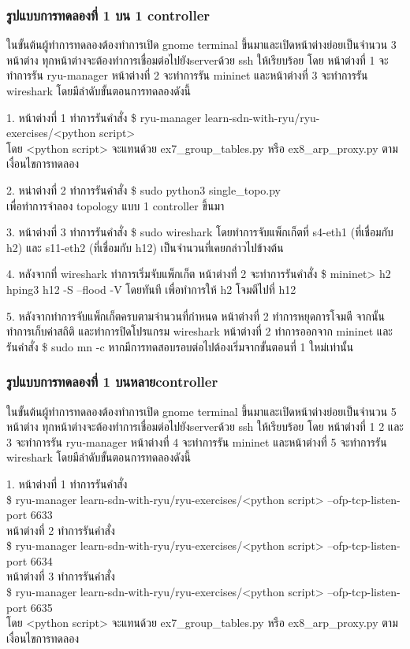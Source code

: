 \subsubsection*{รูปแบบการทดลองที่ 1 บน 1 \gls{controller}}

ในขั้นต้นผู้ทำการทดลองต้องทำการเปิด gnome terminal ขึ้นมาและเปิดหน้าต่างย่อยเป็นจำนวน 3 หน้าต่าง
ทุกหน้าต่างจะต้องทำการเชื่อมต่อไปยัง\gls{server}ด้วย ssh ให้เรียบร้อย
โดย หน้าต่างที่ 1 จะทำการรัน ryu-manager หน้าต่างที่ 2 จะทำการรัน mininet และหน้าต่างที่ 3 จะทำการรัน wireshark
โดยมีลำดับขั้นตอนการทดลองดังนี้


1. หน้าต่างที่ 1 ทำการรันคำสั่ง    
\$ ryu-manager learn-sdn-with-ryu/ryu-exercises/<python script> \\
โดย <python script> จะแทนด้วย ex7\_group\_tables.py หรือ ex8\_arp\_proxy.py ตามเงื่อนไขการทดลอง

2. หน่าต่างที่ 2 ทำการรันคำสั่ง    
\$ sudo python3 single\_topo.py \\
เพื่อทำการจำลอง topology แบบ 1 \gls{controller} ขึ้นมา

3. หน้าต่างที่ 3 ทำการรันคำสั่ง 
\$ sudo wireshark 
โดยทำการจับแพ็กเก็ตที่ s4-eth1 (ที่เชื่อมกับ h2) และ s11-eth2 (ที่เชื่อมกับ h12) เป็นจำนวนที่เคยกล่าวไปข้างต้น

4. หลังจากที่ wireshark ทำการเริ่มจับแพ็กเก็ต หน้าต่างที่ 2 จะทำการรันคำสั่ง \$ mininet> h2 hping3 h12 -S --flood -V
โดยทันที เพื่อทำการให้ h2 โจมตีไปที่ h12

5. หลังจากทำการจับแพ็กเก็ตครบตามจำนวนที่กำหนด หน้าต่างที่ 2 ทำการหยุดการโจมตี จากนั้นทำการเก็บค่าสถิติ และทำการปิดโปรแกรม wireshark
หน้าต่างที่ 2 ทำการออกจาก mininet และรันคำสั่ง \$ sudo mn -c หากมีการทดสอบรอบต่อไปต้องเริ่มจากขั้นตอนที่ 1 ใหม่เท่านั้น

\subsubsection*{รูปแบบการทดลองที่ 1 บนหลาย\gls{controller}}

ในขั้นต้นผู้ทำการทดลองต้องทำการเปิด gnome terminal ขึ้นมาและเปิดหน้าต่างย่อยเป็นจำนวน 5 หน้าต่าง
ทุกหน้าต่างจะต้องทำการเชื่อมต่อไปยัง\gls{server}ด้วย ssh ให้เรียบร้อย
โดย หน้าต่างที่ 1 2 และ 3 จะทำการรัน ryu-manager หน้าต่างที่ 4 จะทำการรัน mininet และหน้าต่างที่ 5 จะทำการรัน wireshark
โดยมีลำดับขั้นตอนการทดลองดังนี้

1. หน้าต่างที่ 1 ทำการรันคำสั่ง \\
\$ ryu-manager learn-sdn-with-ryu/ryu-exercises/<python script> --ofp-tcp-listen-port 6633 \\
\indent หน้าต่างที่ 2 ทำการรันคำสั่ง \\
\$ ryu-manager learn-sdn-with-ryu/ryu-exercises/<python script> --ofp-tcp-listen-port 6634  \\
\indent หน้าต่างที่ 3 ทำการรันคำสั่ง \\
\$ ryu-manager learn-sdn-with-ryu/ryu-exercises/<python script> --ofp-tcp-listen-port 6635  \\
โดย <python script> จะแทนด้วย 
ex7\_group\_tables.py หรือ ex8\_arp\_proxy.py
ตามเงื่อนไขการทดลอง

